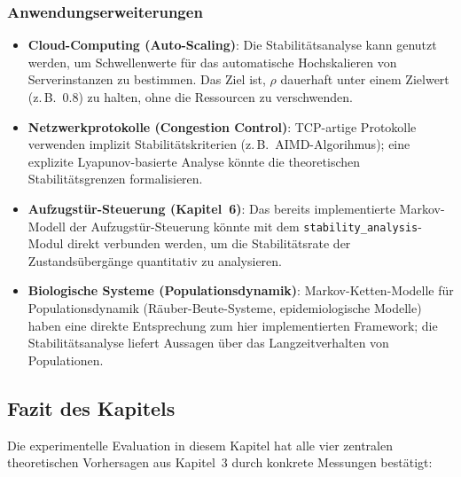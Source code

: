 ﻿\documentclass[a4paper,12pt]{scrreprt}
\theoremstyle{definition}
\begin{document}
\subsubsection{Anwendungserweiterungen}

\begin{itemize}
	\item \textbf{Cloud-Computing (Auto-Scaling)}: Die Stabilitäts\-analyse
	kann genutzt werden, um Schwellenwerte für das automatische
	Hochskalieren von Serverinstanzen zu bestimmen.  Das
	Ziel ist, $\rho$ dauerhaft unter einem Zielwert
	(z.\,B.\ 0.8) zu halten, ohne die Ressourcen zu
	verschwenden.
	
	\item \textbf{Netzwerkprotokolle (Congestion Control)}: TCP-artige
	Protokolle verwenden implizit Stabilitätskriterien (z.\,B.\ 
	AIMD-Algorihmus); eine explizite Lyapunov-basierte Analyse
	könnte die theoretischen Stabilitätsgrenzen formalisieren.
	
	\item \textbf{Aufzugstür-Steuerung (Kapitel~6)}: Das bereits
	implementierte Markov-Modell der Aufzugstür-Steuerung
	könnte mit dem \texttt{stability\_analysis}-Modul
	direkt verbunden werden, um die Stabilitätsrate der
	Zustandsübergänge quantitativ zu analysieren.
	
	\item \textbf{Biologische Systeme (Populationsdynamik)}:
	Markov-Ketten-Modelle für Populationsdynamik
	(Räuber-Beute-Systeme, epidemiologische Modelle) haben
	eine direkte Entsprechung zum hier implementierten Framework;
	die Stabilitätsanalyse liefert Aussagen über das
	Langzeitverhalten von Populationen.
\end{itemize}

\subsection{Fazit des Kapitels}
\label{subsec:fazit-kap8}

Die experimentelle Evaluation in diesem Kapitel hat alle vier
zentralen theoretischen Vorhersagen aus Kapitel~3 durch konkrete
Messungen bestätigt:
\end{document}
